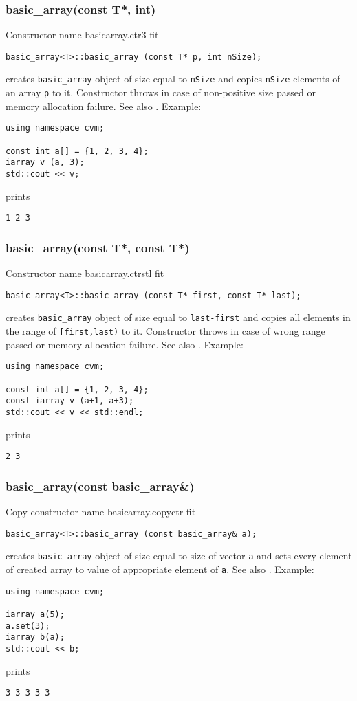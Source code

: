 \subsubsection{basic\_array(const T*, int)}
Constructor%
\pdfdest name {basicarray.ctr3} fit
\begin{verbatim}
basic_array<T>::basic_array (const T* p, int nSize);
\end{verbatim}
creates  \verb"basic_array" object of size equal to 
\verb"nSize" and copies \verb"nSize" elements of
an array \verb"p" to it.
Constructor throws  
in case of non-positive size passed or memory allocation failure.
See also .
Example:
\begin{Verbatim}
using namespace cvm;

const int a[] = {1, 2, 3, 4};
iarray v (a, 3);
std::cout << v;
\end{Verbatim}
prints
\begin{Verbatim}
1 2 3
\end{Verbatim}
\newpage


\subsubsection{basic\_array(const T*, const T*)}
Constructor%
\pdfdest name {basicarray.ctrstl} fit
\begin{verbatim}
basic_array<T>::basic_array (const T* first, const T* last);
\end{verbatim}
creates  \verb"basic_array" object of size equal to 
\verb"last-first" and copies all elements in the range
of \verb"[first,last)" to it.
Constructor throws 
in case of wrong range passed or memory allocation failure.
See also .
Example:
\begin{Verbatim}
using namespace cvm;

const int a[] = {1, 2, 3, 4};
const iarray v (a+1, a+3);
std::cout << v << std::endl;
\end{Verbatim}
prints
\begin{Verbatim}
2 3
\end{Verbatim}
\newpage


\subsubsection{basic\_array(const basic\_array\&)}
Copy constructor%
\pdfdest name {basicarray.copyctr} fit
\begin{verbatim}
basic_array<T>::basic_array (const basic_array& a);
\end{verbatim}
creates  \verb"basic_array" object of size equal to size of
vector \verb"a" and 
sets every element of created array to  value of
appropriate element of  \verb"a".
See also .
Example:
\begin{Verbatim}
using namespace cvm;

iarray a(5);
a.set(3);
iarray b(a);
std::cout << b;
\end{Verbatim}
prints
\begin{Verbatim}
3 3 3 3 3
\end{Verbatim}
\newpage


